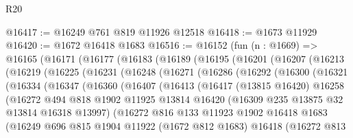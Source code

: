 \begin{lexlean}{R20}
\begin{coremodule}
@16417 := @16249 @761 @819 @11926 @12518
@16418 := @1673 @11929
@16420 := @1672 @16418 @1683
@16516 := @16152
    (fun (n : @1669) =>
    @16165
      (@16171
        (@16177
          (@16183
            (@16189
              (@16195
                (@16201
                  (@16207
                    (@16213
                      (@16219
                        (@16225
                          (@16231
                            (@16248
                              (@16271
                                (@16286
                                  (@16292
                                    (@16300
                                      (@16321
                                        (@16334
                                          (@16347
                                            (@16360
                                              (@16407
                                                (@16413
                                                  (@16417
                                                    (@13815 @16420)
                                                    @16258
                                                    (@16272
                                                      @494
                                                      @818
                                                      @1902
                                                      @11925
                                                      @13814
                                                      @16420
                                                      (@16309 @235 @13875 @32 @13814 @16318 @13997)
                                                      (@16272
                                                        @816
                                                        @133
                                                        @11923
                                                        @1902
                                                        @16418
                                                        @1683
                                                        (@16249
                                                          @696
                                                          @815
                                                          @1904
                                                          @11922
                                                          (@1672 @812 @1683)
                                                          @16418
                                                          (@16272
                                                            @813

\end{coremodule}
\end{lexlean}
